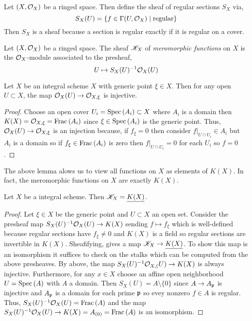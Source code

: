 \documentclass[12pt]{article}
\begin{document}
\begin{definition}
Let $(X, \mathcal{O}_{X})$ be a ringed space. Then define the sheaf of regular sections $S_X$ via, 
\[ S_X(U) = \{ f \in \Gamma(U, \mathcal{O}_{X}) \mid \text{regular} \} \]
Then $S_X$ is a sheaf because a section is regular exactly if it is regular on a cover.
\end{definition}

\begin{definition}
Let $(X, \mathcal{O}_{X})$ be a ringed space. The sheaf $\mathscr{K}_X$ of \textit{meromorphic functions} on $X$ is the $\mathcal{O}_{X}$-module associated to the presheaf,
\[ U \mapsto S_X(U)^{-1} \mathcal{O}_{X}(U) \]
\end{definition}

\begin{lemma}
Let $X$ be an integral scheme $X$ with generic point $\xi \in X$. Then for any open $U \subset X$, the map $\mathcal{O}_{X}(U) \to \mathcal{O}_{X, \xi}$ is injective.
\end{lemma}

\begin{proof}
Choose an open cover $U_i = \mathrm{Spec}\left( A_i \right) \subset X$ where $A_i$ is a domain then $K(X) = \mathcal{O}_{X, \xi} = \mathrm{Frac}\left(A_i\right)$ since $\xi \in \mathrm{Spec}\left( A_i \right)$ is the generic point. Thus, $\mathcal{O}_{X}(U) \to \mathcal{O}_{X, \xi}$ is an injection because, if $f_\xi = 0$ then consider $f|_{U \cap U_i} \in A_i$ but $A_i$ is a domain so if $f_\xi \in \mathrm{Frac}\left(A_i\right)$ is zero then $f|_{U \cap U_i} = 0$ for each $U_i$ so $f = 0$. 
\end{proof}

\begin{rmk}
The above lemma alows us to view all functions on $X$ as elements of $K(X)$. In fact, the meromorphic functions on $X$ are exactly $K(X)$. 
\end{rmk}

\begin{prop}
Let $X$ be a integral scheme. Then $\mathscr{K}_X = \underline{K(X)}$.
\end{prop}

\begin{proof}
Let $\xi \in X$ be the generic point and $U \subset X$ an open set. Consider the  presheaf map $S_X(U)^{-1} \mathcal{O}_{X}(U) \to K(X)$ sending $f \mapsto f_\xi$ which is well-defined because regular sections have $f_\xi \neq 0$ and $K(X)$ is a field so regular sections are invertible in $K(X)$. Sheafifying, gives a map $\mathscr{K}_X \to \underline{K(X)}$. To show this map is an isomorphism it suffices to check on the stalks which can be computed from the above presheaves. By above, the map $S_X(U)^{-1} \mathcal{O}_{X, (}U) \to K(X)$ is always injective. Furthermore, for any $x \in X$ choose an affine open neighborhood $U = \mathrm{Spec}\left( A \right)$ with $A$ a domain. Then $S_X(U) = A \setminus \{ 0 \}$ since $A \to A_{\mathfrak{p}}$ is injective and $A_{\mathfrak{p}}$ is a domain for each prime $\mathfrak{p}$ so evey nonzero $f \in A$ is regular. Thus, $S_X(U)^{-1} \mathcal{O}_{X}(U) = \mathrm{Frac}\left(A\right)$ and the map $S_X(U)^{-1} \mathcal{O}_{X}(U) \to K(X) = A_{(0)} = \mathrm{Frac}\left(A\right)$ is an isomorphism.   
\end{proof}
\end{document}
